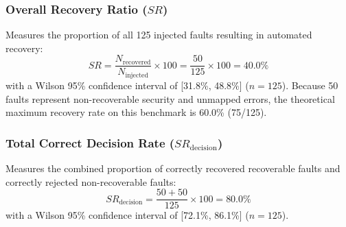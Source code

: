 \documentclass[conference]{IEEEtran}
\begin{document}
\subsubsection{Overall Recovery Ratio ($SR$)}
Measures the proportion of all 125 injected faults resulting in automated recovery:
\begin{equation}
SR = \frac{N_{\text{recovered}}}{N_{\text{injected}}} \times 100 = \frac{50}{125} \times 100 = 40.0\%
\end{equation}
with a Wilson 95\% confidence interval of [31.8\%, 48.8\%] ($n=125$). Because 50 faults represent non-recoverable security and unmapped errors, the theoretical maximum recovery rate on this benchmark is 60.0\% (75/125).

\subsubsection{Total Correct Decision Rate ($SR_{\text{decision}}$)}
Measures the combined proportion of correctly recovered recoverable faults and correctly rejected non-recoverable faults:
\begin{equation}
SR_{\text{decision}} = \frac{50 + 50}{125} \times 100 = 80.0\%
\end{equation}
with a Wilson 95\% confidence interval of [72.1\%, 86.1\%] ($n=125$).
\end{document}
